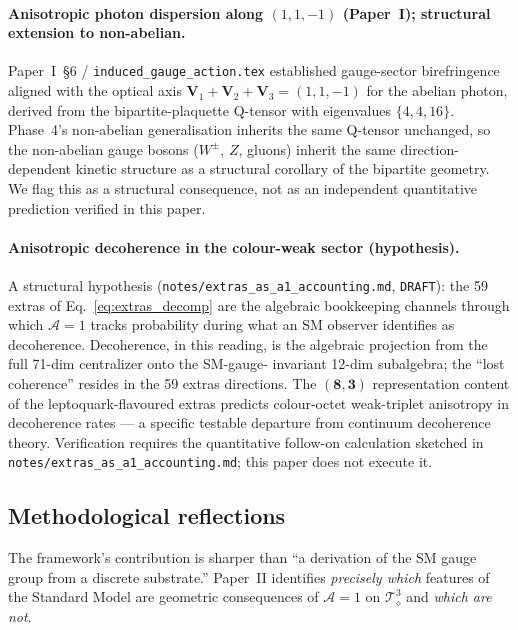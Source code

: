 \paragraph{Anisotropic photon dispersion along $(1, 1, -1)$ (Paper~I); structural extension to non-abelian.}
Paper~I~§6 / \nolinkurl{induced_gauge_action.tex} established
gauge-sector birefringence aligned with the optical axis
$\mathbf{V}_1 + \mathbf{V}_2 + \mathbf{V}_3 = (1, 1, -1)$ for the
abelian photon, derived from the bipartite-plaquette Q-tensor
with eigenvalues $\{4, 4, 16\}$.  Phase~4's non-abelian
generalisation inherits the same Q-tensor unchanged, so the
non-abelian gauge bosons ($W^\pm$, $Z$, gluons) inherit the same
direction-dependent kinetic structure as a structural corollary
of the bipartite geometry.  We flag this as a structural
consequence, not as an independent quantitative prediction
verified in this paper.

\paragraph{Anisotropic decoherence in the colour-weak sector (hypothesis).}
A structural hypothesis (\nolinkurl{notes/extras_as_a1_accounting.md},
\texttt{DRAFT}): the 59 extras of Eq.~\eqref{eq:extras_decomp} are
the algebraic bookkeeping channels through which $\mathcal{A}=1$
tracks probability during what an SM observer identifies as
decoherence.  Decoherence, in this reading, is the algebraic
projection from the full 71-dim centralizer onto the SM-gauge-
invariant 12-dim subalgebra; the ``lost coherence'' resides in
the 59 extras directions.  The
$(\mathbf{8}, \mathbf{3})$ representation content of the
leptoquark-flavoured extras predicts colour-octet weak-triplet
anisotropy in decoherence rates --- a specific testable departure
from continuum decoherence theory.  Verification requires the
quantitative follow-on calculation sketched in
\nolinkurl{notes/extras_as_a1_accounting.md}; this paper does not
execute it.

\subsection{Methodological reflections}
\label{subsec:methodological}

The framework's contribution is sharper than ``a derivation of the
SM gauge group from a discrete substrate.''  Paper~II identifies
\emph{precisely which} features of the Standard Model are geometric
consequences of $\mathcal{A}=1$ on $\mathcal{T}_\diamond^3$ and
\emph{which are not}.

